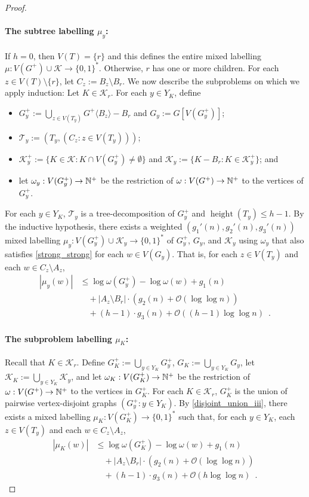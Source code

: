 \documentclass{patmorin}
\renewcommand{\le}{\leqslant}
\DeclareMathOperator{\height}{height}
\newcommand{\torso}[2]{{#1}\langle{#2}\rangle}
\newcommand{\Oh}{\calO}
\let\eqref\cref
\newcommand{\calK}{\mathcal{K}}
\newcommand{\calO}{\mathcal{O}}
\newcommand{\calT}{\mathcal{T}}
\begin{document}
\begin{proof}
    \paragraph{\boldmath The subtree labelling $\mu_y$:}
    If $h=0$, then $V(T)=\{r\}$ and this defines the entire mixed labelling $\mu:V(G^+)\cup\calK\to\{0,1\}^*$.
    Otherwise, $r$ has one or more children.  For each $z\in V(T)\setminus\{r\}$, let $C_z:=B_z\setminus B_r$.
    We now describe the subproblems on which we apply induction: Let $K\in \calK_r$.
    For each $y\in Y_K$, define
    \begin{itemize}
        \item $G^+_y:=\bigcup_{z\in V(T_y)}\torso{G^+}{B_z}-B_r$ and $G_y:=G[V(G^+_y)]$;
        \item $\calT_y:=(T_y, (C_z:z\in V(T_y)))$;
        \item $\calK^+_y:=\{K\in\calK:K\cap V(G^+_y)\neq\emptyset\}$ and $\calK_y:=\{K-B_r:K\in\calK^+_y\}$; and
        \item let $\omega_y:V(G^+_y)\to\mathbb{N}^+$ be the restriction of $\omega:V(G^+)\to\mathbb{N}^+$ to the vertices of $G^+_y$.
    \end{itemize}
    For each $y\in Y_K$, $\calT_y$ is a tree-decomposition of $G^+_y$ and $\height(T_y)\le h-1$.
    By the inductive hypothesis, there exists a weighted $(g_1'(n),g_2'(n),g_3'(n))$ mixed labelling $\mu_y:V(G^+_y)\cup\calK_y\to\{0,1\}^*$ of $G^+_y$, $G_y$, and $\calK_y$ using $\omega_y$ that also satisfies \eqref{strong_strong} for each $w\in V(G_y)$.  That is, for each $z\in V(T_y)$ and each $w\in C_z\setminus A_z$,
    \begin{align*}
       |\mu_y(w)| & \le \log \omega(G^+_y) - \log\omega(w) + g_1(n) \\
       & \quad {} + |A_z\setminus B_r|\cdot (g_2(n) + \Oh(\log\log n)) \\
       & \quad {} + (h-1)\cdot g_3(n) + \Oh((h-1)\log\log n) \enspace .
    \end{align*}

    \paragraph{\boldmath The subproblem labelling $\mu_K$:}
    Recall that $K\in\calK_r$. Define $G^+_K:=\bigcup_{y\in Y_K}G^+_y$, $G_K:=\bigcup_{y\in Y_K}G_y$, let $\calK_K:=\bigcup_{y\in Y_K}\calK_y$, and let $\omega_K:V(G^+_K)\to\mathbb{N}^+$ be the restriction of $\omega:V(G^+)\to\mathbb{N}^+$ to the vertices in $G^+_K$.
    For each $K\in\calK_r$, $G^+_K$ is the union of pairwise vertex-disjoint graphs $(G^+_y:y\in Y_K)$.
    By \cref{disjoint_union_iii}, there exists a mixed labelling $\mu_K:V(G^+_K)\to\{0,1\}^*$ such that, for each $y\in Y_K$, each $z\in V(T_y)$ and each $w\in C_z\setminus A_z$,
    \begin{align*}
       |\mu_K(w)|
       & \le \log \omega(G^+_K) - \log\omega(w) + g_1(n) \\
        & \quad {} + |A_z\setminus B_r|\cdot (g_2(n) + \Oh(\log\log n)) \\
        & \quad {} + (h-1)\cdot g_3(n) + \Oh(h\log\log n) \enspace .
    \end{align*}


\end{proof}
\end{document}
